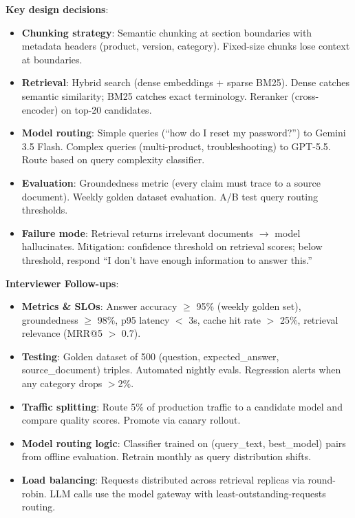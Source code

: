 \textbf{Key design decisions}:
\begin{itemize}[leftmargin=*]
    \item \textbf{Chunking strategy}: Semantic chunking at section boundaries with metadata headers (product, version, category). Fixed-size chunks lose context at boundaries.
    \item \textbf{Retrieval}: Hybrid search (dense embeddings + sparse BM25). Dense catches semantic similarity; BM25 catches exact terminology. Reranker (cross-encoder) on top-20 candidates.
    \item \textbf{Model routing}: Simple queries (``how do I reset my password?'') to Gemini 3.5 Flash. Complex queries (multi-product, troubleshooting) to GPT-5.5. Route based on query complexity classifier.
    \item \textbf{Evaluation}: Groundedness metric (every claim must trace to a source document). Weekly golden dataset evaluation. A/B test query routing thresholds.
    \item \textbf{Failure mode}: Retrieval returns irrelevant documents $\to$ model hallucinates. Mitigation: confidence threshold on retrieval scores; below threshold, respond ``I don't have enough information to answer this.''
\end{itemize}

\textbf{Interviewer Follow-ups}:
\begin{itemize}[leftmargin=*]
    \item \textbf{Metrics \& SLOs}: Answer accuracy $\geq$ 95\% (weekly golden set), groundedness $\geq$ 98\%, p95 latency $<$ 3s, cache hit rate $>$ 25\%, retrieval relevance (MRR@5 $>$ 0.7).
    \item \textbf{Testing}: Golden dataset of 500 (question, expected\_answer, source\_document) triples. Automated nightly evals. Regression alerts when any category drops $>$2\%.
    \item \textbf{Traffic splitting}: Route 5\% of production traffic to a candidate model and compare quality scores. Promote via canary rollout.
    \item \textbf{Model routing logic}: Classifier trained on (query\_text, best\_model) pairs from offline evaluation. Retrain monthly as query distribution shifts.
    \item \textbf{Load balancing}: Requests distributed across retrieval replicas via round-robin. LLM calls use the model gateway with least-outstanding-requests routing.
\end{itemize}

